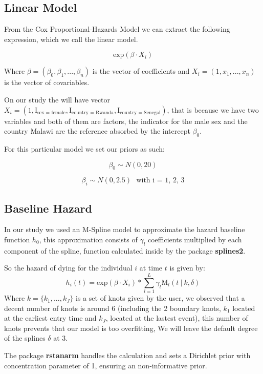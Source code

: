 \documentclass[
  twocolumn]{article}
\begin{document}
\hypertarget{linear-model}{%
\subsection{Linear Model}\label{linear-model}}

From the Cox Proportional-Hazards Model we can extract the following
expression, which we call the linear model.

\[
\mathrm{exp}(\beta \cdot X_i)
\]

Where \(\beta = (\beta_0, \beta_1, ... , \beta_n)\) is the vector of
coefficients and \(X_i = (1, x_1, ..., x_n)\) is the vector of
covariables.

On our study the will have vector
\(X_i= (1,\text{I}_{\text{sex = female}}, \text{I}_{\text{country = Rwanda}}, \text{I}_{\text{country = Senegal}})\),
that is because we have two variables and both of them are factors, the
indicator for the male sex and the country Malawi are the reference
absorbed by the intercept \(\beta_0\).

For this particular model we set our priors as such:

\[
\beta_0 \sim N(0, 20)
\]

\[
\beta_{i} \sim N(0,2.5) \ \ \ \text{with   i = 1, 2, 3}
\]

\hypertarget{baseline-hazard}{%
\subsection{Baseline Hazard}\label{baseline-hazard}}

In our study we used an M-Spline model to approximate the hazard
baseline function \(h_0\), this approximation consists of \(\gamma_l\)
coefficients multiplied by each component of the spline, function
calculated inside by the package \textbf{splines2}.

So the hazard of dying for the individual \(i\) at time \(t\) is given
by:\[
h_i(t) = \mathrm{exp}(\beta \cdot X_i)\ast\sum_{l = 1}^{L}\gamma_l \text{M}_l(t \ | \ k, \delta) 
\]Where \(k = \{k_1, ... ,k_J\}\) is a set of knots given by the user,
we observed that a decent number of knots is around 6 (including the 2
boundary knots, \(k_1\) located at the earliest entry time and \(k_J\),
located at the lastest event), this number of knots prevents that our
model is too overfitting, We will leave the default degree of the
splines \(\delta\) at \(3\).

The package \textbf{rstanarm} handles the calculation and sets a
Dirichlet prior with concentration parameter of 1, ensuring an
non-informative prior.
\end{document}
